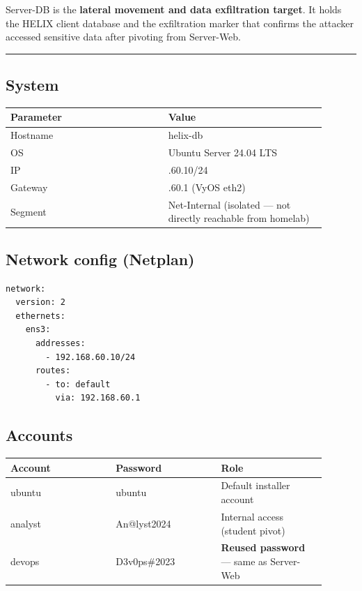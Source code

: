Server-DB is the \textbf{lateral movement and data exfiltration target}. It holds the HELIX client database and the exfiltration marker that confirms the attacker accessed sensitive data after pivoting from Server-Web.

\begin{center}\rule{0.5\linewidth}{0.5pt}\end{center}

\subsection{System}

{\footnotesize\begin{longtable}[]{@{}
  >{\raggedright\arraybackslash}p{0.45\linewidth}
  >{\raggedright\arraybackslash}p{0.45\linewidth}@{}}
\toprule\noalign{}
\begin{minipage}[b]{\linewidth}\raggedright
Parameter
\end{minipage} & \begin{minipage}[b]{\linewidth}\raggedright
Value
\end{minipage} \\
\midrule\noalign{}
\endhead
\bottomrule\noalign{}
\endlastfoot
Hostname & helix-db \\
OS & Ubuntu Server 24.04 LTS \\
IP & 192.168.60.10/24 \\
Gateway & 192.168.60.1 (VyOS eth2) \\
Segment & Net-Internal (isolated --- not directly reachable from homelab) \\
\end{longtable}}

\subsection{Network config (Netplan)}

\begin{lstlisting}
network:
  version: 2
  ethernets:
    ens3:
      addresses:
        - 192.168.60.10/24
      routes:
        - to: default
          via: 192.168.60.1
\end{lstlisting}

\subsection{Accounts}

{\footnotesize\begin{longtable}[]{@{}>{\raggedright\arraybackslash}p{0.30\linewidth}
  >{\raggedright\arraybackslash}p{0.30\linewidth}
  >{\raggedright\arraybackslash}p{0.30\linewidth}@{}}
\toprule\noalign{}
Account & Password & Role \\
\midrule\noalign{}
\endhead
\bottomrule\noalign{}
\endlastfoot
ubuntu & ubuntu & Default installer account \\
analyst & An@lyst2024 & Internal access (student pivot) \\
devops & D3v0ps\#2023 & \textbf{Reused password} --- same as Server-Web \\
\end{longtable}}

